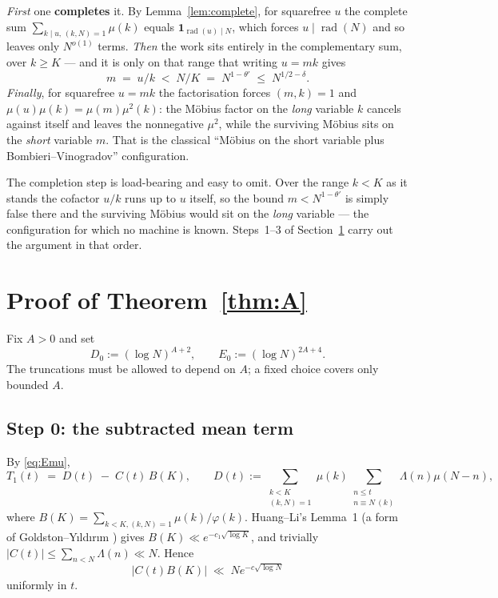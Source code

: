 \documentclass[11pt,a4paper]{article}
\theoremstyle{plain}
\theoremstyle{definition}
\theoremstyle{remark}
\DeclareMathOperator{\rad}{rad}
\begin{document}
\emph{First} one \textbf{completes} it. By Lemma~\ref{lem:complete},
for squarefree $u$ the complete sum
$\sum_{k\mid u,\,(k,N)=1}\mu(k)$ equals $\mathbf 1_{\rad(u)\mid N}$,
which forces $u\mid\rad(N)$ and so leaves only $N^{o(1)}$ terms.
\emph{Then} the work sits entirely in the complementary sum, over
$k\ge K$ --- and it is only on that range that writing $u=mk$ gives
\[
  m\;=\;u/k\;<\;N/K\;=\;N^{1-\theta'}\;\le\;N^{1/2-\delta}.
\]
\emph{Finally}, for squarefree $u=mk$ the factorisation forces
$(m,k)=1$ and $\mu(u)\mu(k)=\mu(m)\mu^2(k)$: the M\"obius factor on
the \emph{long} variable $k$ cancels against itself and leaves the
nonnegative $\mu^2$, while the surviving M\"obius sits on the
\emph{short} variable $m$. That is the classical ``M\"obius on the
short variable plus Bombieri--Vinogradov'' configuration.

The completion step is load-bearing and easy to omit. Over the range
$k<K$ as it stands the cofactor $u/k$ runs up to $u$ itself, so the
bound $m<N^{1-\theta'}$ is simply false there and the surviving
M\"obius would sit on the \emph{long} variable --- the configuration
for which no machine is known. Steps~1--3 of Section~\ref{sec:proof}
carry out the argument in that order.

\section{Proof of \texorpdfstring{Theorem~\ref{thm:A}}{the first theorem}}
\label{sec:proof}

Fix $A>0$ and set
\begin{equation}\label{eq:trunc}
  D_0:=(\log N)^{A+2},\qquad E_0:=(\log N)^{2A+4}.
\end{equation}
The truncations must be allowed to depend on $A$; a fixed choice
covers only bounded $A$.

\subsection{Step 0: the subtracted mean term}

By \eqref{eq:Emu},
\begin{equation}\label{eq:split0}
  T_1(t)\;=\;D(t)\;-\;C(t)\,B(K),
  \qquad
  D(t):=\sum_{\substack{k<K\\(k,N)=1}}\mu(k)
        \sum_{\substack{n\le t\\ n\equiv N\ (k)}}\Lambda(n)\mu(N-n),
\end{equation}
where $B(K)=\sum_{k<K,(k,N)=1}\mu(k)/\varphi(k)$. Huang--Li's Lemma~1
(a form of Goldston--Y{\i}ld{\i}r{\i}m \cite{GY}) gives
$B(K)\ll e^{-c_1\sqrt{\log K}}$, and trivially
$|C(t)|\le\sum_{n<N}\Lambda(n)\ll N$. Hence
\begin{equation}\label{eq:meanterm}
  |C(t)B(K)|\;\ll\;Ne^{-c\sqrt{\log N}}
\end{equation}
uniformly in $t$.
\end{document}
